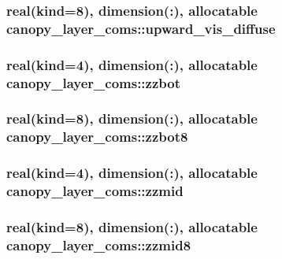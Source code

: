 \subsubsection[{\texorpdfstring{upward\+\_\+vis\+\_\+diffuse}{upward_vis_diffuse}}]{\setlength{\rightskip}{0pt plus 5cm}real(kind=8), dimension(\+:), allocatable canopy\+\_\+layer\+\_\+coms\+::upward\+\_\+vis\+\_\+diffuse}\hypertarget{namespacecanopy__layer__coms_a8c51c8b265b6e659631e5012541c8479}{}\label{namespacecanopy__layer__coms_a8c51c8b265b6e659631e5012541c8479}
\subsubsection[{\texorpdfstring{zzbot}{zzbot}}]{\setlength{\rightskip}{0pt plus 5cm}real(kind=4), dimension(\+:), allocatable canopy\+\_\+layer\+\_\+coms\+::zzbot}\hypertarget{namespacecanopy__layer__coms_a4c8b994b7f3ea4ea983425f467310308}{}\label{namespacecanopy__layer__coms_a4c8b994b7f3ea4ea983425f467310308}
\subsubsection[{\texorpdfstring{zzbot8}{zzbot8}}]{\setlength{\rightskip}{0pt plus 5cm}real(kind=8), dimension(\+:), allocatable canopy\+\_\+layer\+\_\+coms\+::zzbot8}\hypertarget{namespacecanopy__layer__coms_a7719283fbd377164b1912aaa64947f55}{}\label{namespacecanopy__layer__coms_a7719283fbd377164b1912aaa64947f55}
\subsubsection[{\texorpdfstring{zzmid}{zzmid}}]{\setlength{\rightskip}{0pt plus 5cm}real(kind=4), dimension(\+:), allocatable canopy\+\_\+layer\+\_\+coms\+::zzmid}\hypertarget{namespacecanopy__layer__coms_a708651b13f83ca19034c43fe5fef514f}{}\label{namespacecanopy__layer__coms_a708651b13f83ca19034c43fe5fef514f}
\subsubsection[{\texorpdfstring{zzmid8}{zzmid8}}]{\setlength{\rightskip}{0pt plus 5cm}real(kind=8), dimension(\+:), allocatable canopy\+\_\+layer\+\_\+coms\+::zzmid8}\hypertarget{namespacecanopy__layer__coms_a129061ed5b13a9746851e47fb6761d34}{}\label{namespacecanopy__layer__coms_a129061ed5b13a9746851e47fb6761d34}
